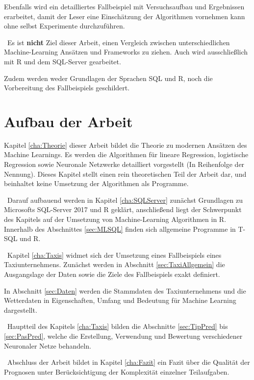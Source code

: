 Ebenfalls wird ein detailliertes Fallbeispiel mit Versuchsaufbau und Ergebnissen erarbeitet, damit der Leser eine Einschätzung der Algorithmen vornehmen kann ohne selbst Experimente durchzuführen.

~\newline Es ist \textbf{nicht} Ziel dieser Arbeit, einen Vergleich zwischen unterschiedlichen Machine-Learning Ansätzen und Frameworks zu ziehen. Auch wird ausschließlich mit R und dem SQL-Server gearbeitet. 

Zudem werden weder Grundlagen der Sprachen SQL und R, noch die Vorbereitung des Fallbeispiels geschildert.

\section{Aufbau der Arbeit}
Kapitel \ref{cha:Theorie} dieser Arbeit bildet die Theorie zu modernen Ansätzen des Machine Learnings. Es werden die Algorithmen für lineare Regression, logistische Regression sowie Neuronale Netzwerke detailliert vorgestellt (In Reihenfolge der Nennung). Dieses Kapitel stellt einen rein theoretischen Teil der Arbeit dar, und beinhaltet keine Umsetzung der Algorithmen als Programme.

~\newline Darauf aufbauend  werden in Kapitel \ref{cha:SQLServer} zunächst Grundlagen zu Microsofts SQL-Server 2017 und R geklärt, anschließend liegt der Schwerpunkt des Kapitels auf der Umsetzung von Machine-Learning Algorithmen in R. Innerhalb des Abschnittes \ref{sec:MLSQL} finden sich allgemeine Programme in T-SQL und R. 

~\newline Kapitel \ref{cha:Taxis} widmet sich der Umsetzung eines Fallbeispiels eines Taxiunternehmens. Zunächst werden in Abschnitt \ref{sec:TaxiAllgemein} die Ausgangslage der Daten sowie die Ziele des Fallbeispiels exakt definiert. 

In Abschnitt \ref{sec:Daten} werden die Stammdaten des Taxiunternehmens und die Wetterdaten in Eigenschaften, Umfang und Bedeutung für Machine Learning dargestellt. 

~\newline Hauptteil des Kapitels \ref{cha:Taxis} bilden die Abschnitte \ref{sec:TipPred} bis \ref{sec:PasPred}, welche die Erstellung, Verwendung und Bewertung verschiedener Neuronaler Netze behandeln. 

~\newline Abschluss der Arbeit bildet in Kapitel \ref{cha:Fazit} ein Fazit über die Qualität der Prognosen unter Berücksichtigung der Komplexität einzelner Teilaufgaben.
